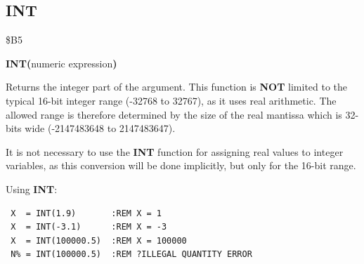 
\newpage
\subsection{INT}
\begin{description}[leftmargin=2cm,style=nextline]
\item [Token:] \$B5
\item [Format:] {\bf INT(}numeric expression{\bf)}
\item [Usage:] Returns the integer part of the argument.
               This function is {\bf NOT} limited to the typical
               16-bit integer range (-32768 to 32767), as
               it uses real arithmetic. The allowed range is
               therefore determined by the size of the real
               mantissa which is 32-bits wide (-2147483648 to 2147483647).

\item [Remarks:] It is not necessary to use the {\bf INT}
               function for assigning real values to integer
               variables, as this conversion will be done
               implicitly, but only for the 16-bit range.

\item [Examples:] Using {\bf INT}:
\begin{tcolorbox}[colback=black,coltext=white]
\verbatimfont{\codefont}
\begin{verbatim}
 X  = INT(1.9)       :REM X = 1
 X  = INT(-3.1)      :REM X = -3
 X  = INT(100000.5)  :REM X = 100000
 N% = INT(100000.5)  :REM ?ILLEGAL QUANTITY ERROR
\end{verbatim}
\end{tcolorbox}
\end{description}


\newpage
